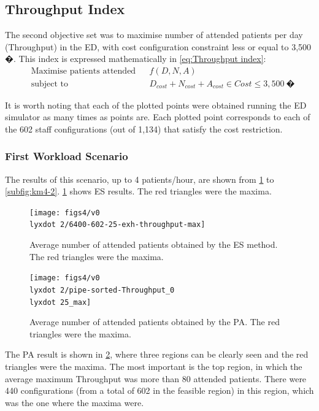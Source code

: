 \subsection{Throughput Index}

The second objective set was to maximise number of attended patients
per day (Throughput) in the ED, with cost configuration constraint
less or equal to 3,500 �. This index is expressed mathematically in
\ref{eq:Throughput index}:\vspace*{-0.125cm}
\begin{equation}
\begin{aligned} & {\text{Maximise patients attended}} &  & f(D,N,A)\\
 & \text{subject to} &  & D_{cost}+N_{cost}+A_{cost}\in Cost\leq3,500\:\text{�}
\end{aligned}
\label{eq:Throughput index}
\end{equation}


It is worth noting that each of the plotted points were obtained running
the ED simulator as many times as points are. Each plotted point corresponds
to each of the 602 staff configurations (out of 1,134) that satisfy
the cost restriction.


\subsubsection{First Workload Scenario}

The results of this scenario, up to 4 patients/hour, are shown from
\ref{subfig:es4-2} to \ref{subfig:km4-2}. \ref{subfig:es4-2} shows
ES results. The red triangles were the maxima.
\begin{figure}[H]
\centering{}\vspace*{-0.2cm}\texttt{[image: figs4/v0\\lyxdot 2/6400-602-25-exh-throughput-max]}\caption{Average number of attended patients obtained by the ES method. The
red triangles were the maxima. \label{subfig:es4-2}}
\end{figure}
 \vspace*{-0.2cm}

\begin{figure}[H]
\centering{}\vspace*{-0.2cm}\texttt{[image: figs4/v0\\lyxdot 2/pipe-sorted-Throughput\_0\\lyxdot 25\_max]}\caption{Average number of attended patients obtained by the PA. The red triangles
were the maxima. \label{subfig:pipe4-2}}
\end{figure}
 The PA result is shown in \ref{subfig:pipe4-2}, where three regions
can be clearly seen and the red triangles were the maxima. The most
important is the top region, in which the average maximum Throughput
was more than 80 attended patients. There were 440 configurations
(from a total of 602 in the feasible region) in this region, which
was the one where the maxima were.

